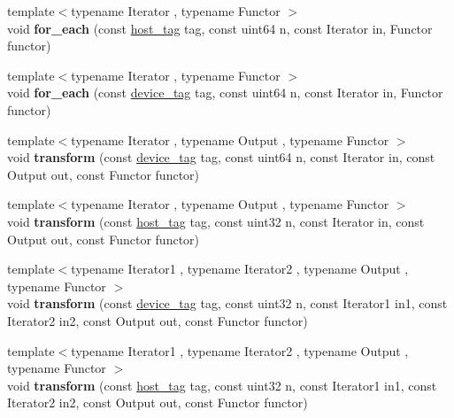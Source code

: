 \begin{DoxyCompactItemize}
\item 
\mbox{\label{namespacecugar_aa6b34befdf9a88f41d50e9bf0ee1ca7a}} 
{\footnotesize template$<$typename Iterator , typename Functor $>$ }\\void {\bfseries for\+\_\+each} (const \hyperlink{structcugar_1_1host__tag}{host\+\_\+tag} tag, const uint64 n, const Iterator in, Functor functor)
\item 
\mbox{\label{namespacecugar_a9a903bb8404fef35c5bef7afe8957c70}} 
{\footnotesize template$<$typename Iterator , typename Functor $>$ }\\void {\bfseries for\+\_\+each} (const \hyperlink{structcugar_1_1device__tag}{device\+\_\+tag} tag, const uint64 n, const Iterator in, Functor functor)
\item 
\mbox{\label{namespacecugar_a752adbd457b83d7acd79a5a744b3b854}} 
{\footnotesize template$<$typename Iterator , typename Output , typename Functor $>$ }\\void {\bfseries transform} (const \hyperlink{structcugar_1_1device__tag}{device\+\_\+tag} tag, const uint64 n, const Iterator in, const Output out, const Functor functor)
\item 
\mbox{\label{namespacecugar_afeebe1709938dbe2fb5d993800f94cc6}} 
{\footnotesize template$<$typename Iterator , typename Output , typename Functor $>$ }\\void {\bfseries transform} (const \hyperlink{structcugar_1_1host__tag}{host\+\_\+tag} tag, const uint32 n, const Iterator in, const Output out, const Functor functor)
\item 
\mbox{\label{namespacecugar_ac098494d29d9a34221db932547424157}} 
{\footnotesize template$<$typename Iterator1 , typename Iterator2 , typename Output , typename Functor $>$ }\\void {\bfseries transform} (const \hyperlink{structcugar_1_1device__tag}{device\+\_\+tag} tag, const uint32 n, const Iterator1 in1, const Iterator2 in2, const Output out, const Functor functor)
\item 
\mbox{\label{namespacecugar_af82febb6b9fb4ef865cc9e1cf3c4f6cb}} 
{\footnotesize template$<$typename Iterator1 , typename Iterator2 , typename Output , typename Functor $>$ }\\void {\bfseries transform} (const \hyperlink{structcugar_1_1host__tag}{host\+\_\+tag} tag, const uint32 n, const Iterator1 in1, const Iterator2 in2, const Output out, const Functor functor)

\end{DoxyCompactItemize}
